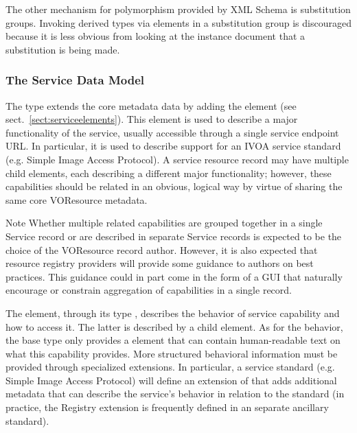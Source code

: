 \documentclass[11pt,a4paper]{ivoa}
\begin{document}
The other mechanism for polymorphism provided by XML Schema is
substitution groups.  Invoking derived  types via
elements in a substitution group is discouraged because it is less
obvious from looking at the instance document that a substitution is
being made.  


\subsubsection{The Service Data Model}
\label{sect:servicemodel}


The  type extends the core 
metadata data by adding the  element (see
sect.~\ref{sect:serviceelements}).  This element is used to describe a major
functionality of the service, usually accessible through a single
service endpoint URL.  In particular, it is used to describe support for
an IVOA service standard (e.g. Simple Image Access Protocol).  A service
resource record may have multiple child  elements,
each describing a different major functionality; however, these
capabilities should be related in an obvious, logical way by virtue of
sharing the same core VOResource metadata.  


\begin{admonition}{Note}
Whether multiple related capabilities are grouped together in a
single Service record or are described in separate Service
records is expected to be the choice of the VOResource record
author.  However, it is also expected that resource registry
providers will provide some guidance to authors on best
practices.  This guidance could in part come in the form of a
GUI that naturally encourage or constrain aggregation of
capabilities in a single record.
\end{admonition}

The  element, through its type ,
describes the behavior of service capability and how to access it.  The
latter is described by a child  element.  As for the
behavior, the base  type only provides a
 element that can contain human-readable text on what
this capability provides.  More structured behavioral information must
be provided through specialized  extensions.  In
particular, a service standard (e.g. Simple Image
Access Protocol) will define an extension of  that
adds additional metadata that can describe the service's behavior in
relation to the standard (in practice, the Registry extension is
frequently defined in an separate ancillary standard). 
\end{document}
